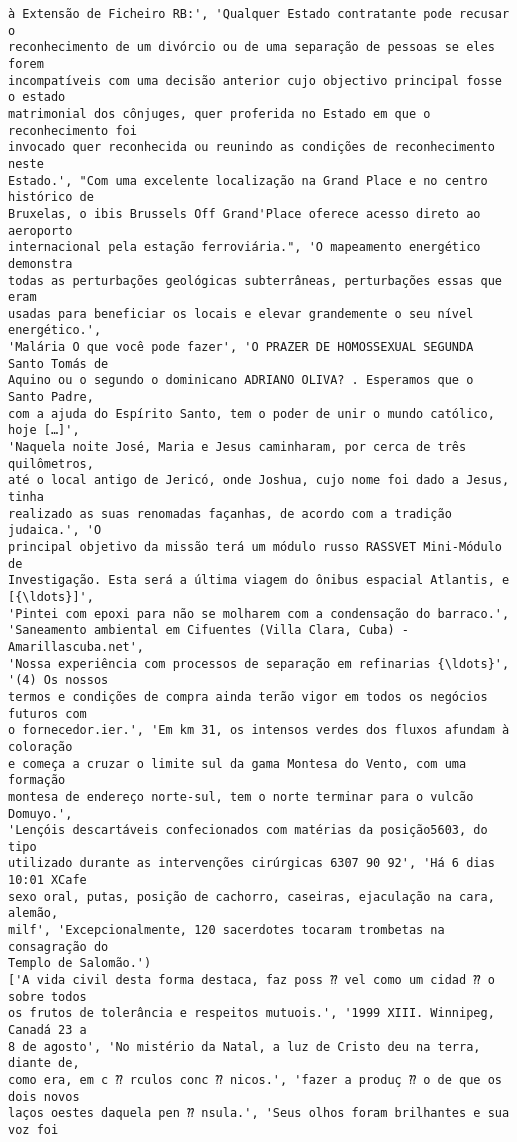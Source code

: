 \documentclass[10pt]{article}
\begin{document}
\begin{Verbatim}[commandchars=\\\{\}]
à Extensão de Ficheiro RB:', 'Qualquer Estado contratante pode recusar o
reconhecimento de um divórcio ou de uma separação de pessoas se eles forem
incompatíveis com uma decisão anterior cujo objectivo principal fosse o estado
matrimonial dos cônjuges, quer proferida no Estado em que o reconhecimento foi
invocado quer reconhecida ou reunindo as condições de reconhecimento neste
Estado.', "Com uma excelente localização na Grand Place e no centro histórico de
Bruxelas, o ibis Brussels Off Grand'Place oferece acesso direto ao aeroporto
internacional pela estação ferroviária.", 'O mapeamento energético demonstra
todas as perturbações geológicas subterrâneas, perturbações essas que eram
usadas para beneficiar os locais e elevar grandemente o seu nível energético.',
'Malária O que você pode fazer', 'O PRAZER DE HOMOSSEXUAL SEGUNDA Santo Tomás de
Aquino ou o segundo o dominicano ADRIANO OLIVA? . Esperamos que o Santo Padre,
com a ajuda do Espírito Santo, tem o poder de unir o mundo católico, hoje […]',
'Naquela noite José, Maria e Jesus caminharam, por cerca de três quilômetros,
até o local antigo de Jericó, onde Joshua, cujo nome foi dado a Jesus, tinha
realizado as suas renomadas façanhas, de acordo com a tradição judaica.', 'O
principal objetivo da missão terá um módulo russo RASSVET Mini-Módulo de
Investigação. Esta será a última viagem do ônibus espacial Atlantis, e [{\ldots}]',
'Pintei com epoxi para não se molharem com a condensação do barraco.',
'Saneamento ambiental em Cifuentes (Villa Clara, Cuba) - Amarillascuba.net',
'Nossa experiência com processos de separação em refinarias {\ldots}', '(4) Os nossos
termos e condições de compra ainda terão vigor em todos os negócios futuros com
o fornecedor.ier.', 'Em km 31, os intensos verdes dos fluxos afundam à coloração
e começa a cruzar o limite sul da gama Montesa do Vento, com uma formação
montesa de endereço norte-sul, tem o norte terminar para o vulcão Domuyo.',
'Lençóis descartáveis confecionados com matérias da posição5603, do tipo
utilizado durante as intervenções cirúrgicas 6307 90 92', 'Há 6 dias 10:01 XCafe
sexo oral, putas, posição de cachorro, caseiras, ejaculação na cara, alemão,
milf', 'Excepcionalmente, 120 sacerdotes tocaram trombetas na consagração do
Templo de Salomão.')
['A vida civil desta forma destaca, faz poss ⁇ vel como um cidad ⁇ o sobre todos
os frutos de tolerância e respeitos mutuois.', '1999 XIII. Winnipeg, Canadá 23 a
8 de agosto', 'No mistério da Natal, a luz de Cristo deu na terra, diante de,
como era, em c ⁇ rculos conc ⁇ nicos.', 'fazer a produç ⁇ o de que os dois novos
laços oestes daquela pen ⁇ nsula.', 'Seus olhos foram brilhantes e sua voz foi

\end{Verbatim}
\end{document}
